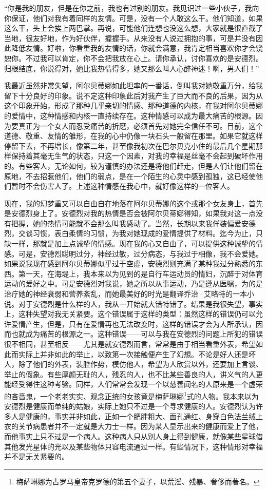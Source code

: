 \par “你是我的朋友，但是在你之前，我也有过别的朋友。我见识过一些小伙子，我向你保证，他们对我有着同样的友情。可是，没有一个人敢这么干。他们知道，如果这么干，头上会挨上两巴掌。再说，可能他们连想也没这么想，大家就是很直截了当地，很友好地，作为好伙伴，握握手。从来没有人说过拥抱的事，可是并没有因此降低友情。好啦，你看重我的友情的话，你就会满意，我肯定相当喜欢你才会饶恕你。不过我可以肯定，你不会把我放在心上。请你承认，讨你喜欢的是安德烈。归根结底，你说得对，她比我热情得多，她又那么叫人心醉神迷！啊，男人们！”
\par 我最近虽然非常失望，阿尔贝蒂娜如此坦率的一番话，倒叫我对她敬重万分，给我留下十分良好的印象。说不定这种印象此后对我产生了巨大而不良的后果，因为从这个印象开始，形成了那种几乎亲切的情感、那种道德的内核，在我对阿尔贝蒂娜的爱情中，这种情感和内核一直持续存在。这种情感可以成为最大痛苦的根源。因为要真正为一个女人而忍受痛苦的折磨，必须首先对她完全信任不可。目前，这个道德、敬重、友情的雏形，在我的心中仍像一块石头一般留在那里。如果它就这样停留下去，不再增长，像第二年，甚至像我初次在巴尔贝克小住的最后几个星期那样保持着其毫无生气的状态，只这一个因素，对我的幸福是丝毫不会起到破坏作用的。有些客人，无论如何，较为谨慎的办法还是将他们赶走，但是人们让他们留在原地，不去招惹他们，他们的弱点，是在一个陌生的心灵中感到孤独，这已经使他们暂时不会伤害人了。上述这种情感在我心中，就好像这样的一位客人。
\par 现在，我的幻梦重又可以自由自在地落在阿尔贝蒂娜的这个或那个女友身上，首先是安德烈身上了。安德烈对我的热情是否会被阿尔贝蒂娜得知，如果我对这一点没有把握，她的热情可能就不会那么叫我感动了。当然，长期以来我佯装偏爱安德烈，交谈习惯，表白柔情的习惯，为我对她现成的爱情提供了材料。迄今为止，只缺一样，那就是加上点诚挚的情感。现在我的心又自由了，可以提供这种诚挚的情感。可是，安德烈聪明过分，神经过敏，过分病态，与我过于相像，我不会爱她。如果说我现在感到阿尔贝蒂娜似乎过于空虚，安德烈则充满了某种我过分熟悉的东西。第一天，在海堤上，我本来以为见到的是自行车运动员的情妇，沉醉于对体育运动的爱好之中。可是安德烈对我说，她之所以从事运动，乃是遵从医嘱，为的是治疗她的神经衰弱和营养紊乱，而她最美好的时光是翻译乔治·艾略特的一本小说。对于安德烈是什么样的人，我从一开始就大错特错了。结果是我很失望，事实上，这种失望对我无关紧要。这个错误属于这样的类型：虽然这样的错误仍可以允许爱情产生，但是，只有在爱情再也无法改变时，这样的错误才会为人所承认，因而也就成为痛苦的根源之一。这种错误——可以与我在安德烈的问题上所犯的错误很不相同，甚至相反——尤其是就安德烈而言，常常是由于相当看重外表，希望如此而实际上并非如此的举止，以致第一次接触便产生了幻想。不论是好人还是坏人，除了他们的外表，装腔作势，模仿他人，希望为人欣赏以外，还要加上言谈、举止的假象。有些厚颜无耻的人，残忍的人，也不比某些善良的人，讲义气的人更能经受得住这种考验。同样，人们常常会发现一个以慈善闻名的人原来是一个虚荣的吝啬鬼，一个老老实实、观念正统的女孩竟是梅萨琳娜\footnote{梅萨琳娜为古罗马皇帝克罗德的第五个妻子，以荒淫、残暴、奢侈而著名。}式的人物。我本来以为安德烈是健康而单纯的姑娘，实际上她只不过是一个寻求健康的人。安德烈认为许多人是健康的，事实并非如此，正如一个肥胖粗大、面孔通红、身穿白色法兰绒上衣的关节病患者并不一定就是大力士一样。因为某人显示出来的健康而爱上了他，而他事实上只不过是一个病人。这种病人只从别人身上得到健康，就像某些星球借其他发光星体的光以及某些物体只容电流通过一样。有些情况下，这种情形对幸福并不是无关紧要的。
